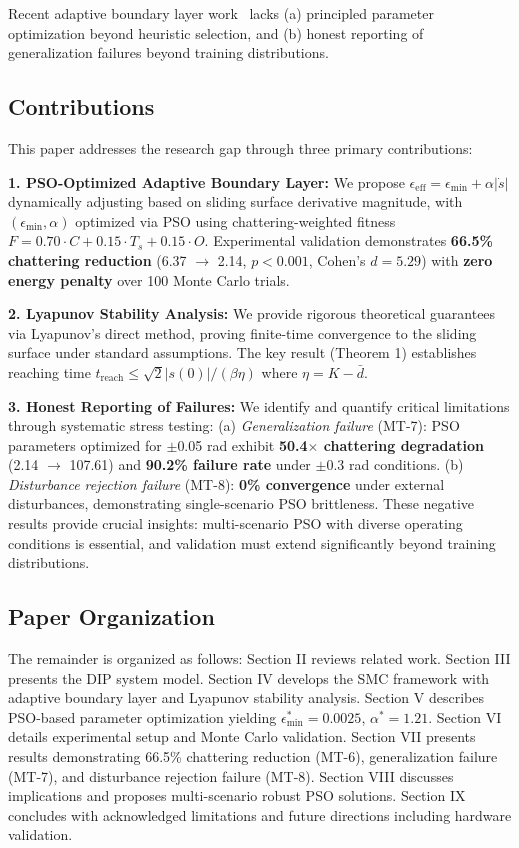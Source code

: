 \documentclass[conference]{IEEEtran}
\begin{document}
Recent adaptive boundary layer work~\cite{ieee2018selfreg,frontiers2024fuzzy} lacks (a) principled parameter optimization beyond heuristic selection, and (b) honest reporting of generalization failures beyond training distributions.

\subsection{Contributions}

This paper addresses the research gap through three primary contributions:

\textbf{1. PSO-Optimized Adaptive Boundary Layer:} We propose $\epsilon_{\text{eff}} = \epsilon_{\min} + \alpha|\dot{s}|$ dynamically adjusting based on sliding surface derivative magnitude, with $(\epsilon_{\min}, \alpha)$ optimized via PSO using chattering-weighted fitness $F = 0.70 \cdot C + 0.15 \cdot T_s + 0.15 \cdot O$. Experimental validation demonstrates \textbf{66.5\% chattering reduction} (6.37 $\rightarrow$ 2.14, $p < 0.001$, Cohen's $d = 5.29$) with \textbf{zero energy penalty} over 100 Monte Carlo trials.

\textbf{2. Lyapunov Stability Analysis:} We provide rigorous theoretical guarantees via Lyapunov's direct method, proving finite-time convergence to the sliding surface under standard assumptions. The key result (Theorem 1) establishes reaching time $t_{\text{reach}} \leq \sqrt{2}|s(0)|/(\beta\eta)$ where $\eta = K - \bar{d}$.

\textbf{3. Honest Reporting of Failures:} We identify and quantify critical limitations through systematic stress testing: (a) \emph{Generalization failure} (MT-7): PSO parameters optimized for $\pm$0.05 rad exhibit \textbf{50.4$\times$ chattering degradation} (2.14 $\rightarrow$ 107.61) and \textbf{90.2\% failure rate} under $\pm$0.3 rad conditions. (b) \emph{Disturbance rejection failure} (MT-8): \textbf{0\% convergence} under external disturbances, demonstrating single-scenario PSO brittleness. These negative results provide crucial insights: multi-scenario PSO with diverse operating conditions is essential, and validation must extend significantly beyond training distributions.

\subsection{Paper Organization}

The remainder is organized as follows: Section II reviews related work. Section III presents the DIP system model. Section IV develops the SMC framework with adaptive boundary layer and Lyapunov stability analysis. Section V describes PSO-based parameter optimization yielding $\epsilon_{\min}^* = 0.0025$, $\alpha^* = 1.21$. Section VI details experimental setup and Monte Carlo validation. Section VII presents results demonstrating 66.5\% chattering reduction (MT-6), generalization failure (MT-7), and disturbance rejection failure (MT-8). Section VIII discusses implications and proposes multi-scenario robust PSO solutions. Section IX concludes with acknowledged limitations and future directions including hardware validation.
\end{document}
